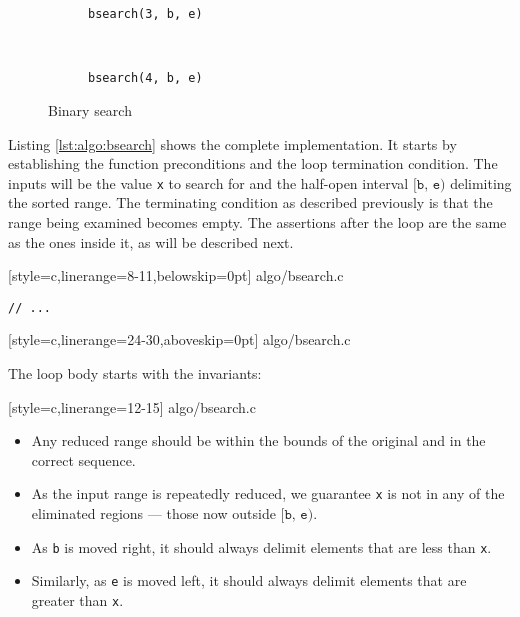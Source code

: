 \begin{figure}[p]
    \centering
    
    \vspace{2\baselineskip}
    \begin{subfigure}[h]{\textwidth}
        \centering
        
        \caption{\texttt{bsearch(3, b, e)}}
        \label{fig:algo:bsearch0}
    \end{subfigure}
    \\[\baselineskip]
    \begin{subfigure}[h]{\textwidth}
        \centering
        
        \caption{\texttt{bsearch(4, b, e)}}
        \label{fig:algo:bsearch1}
    \end{subfigure}
    \caption{Binary search}
\end{figure}

Listing \ref{lst:algo:bsearch} shows the complete implementation.  It starts by
establishing the function preconditions and the loop termination condition.  The
inputs will be the value \texttt{x} to search for and the half-open interval
$\texttt{[b, e)}$ delimiting the sorted range.  The terminating condition as
described previously is that the range being examined becomes empty.  The
assertions after the loop are the same as the ones inside it, as will be
described next.


    [style=c,linerange=8-11,belowskip=0pt]
    {algo/bsearch.c}
\begin{lstlisting}[aboveskip=0pt,belowskip=0pt]
        // ...
\end{lstlisting}

    [style=c,linerange=24-30,aboveskip=0pt]
    {algo/bsearch.c}

The loop body starts with the invariants:


    [style=c,linerange=12-15]
    {algo/bsearch.c}

\vspace{-\baselineskip}
\begin{itemize}
    \item
        Any reduced range should be within the bounds of the original and in the
        correct sequence.
    \item
        As the input range is repeatedly reduced, we guarantee \texttt{x} is not
        in any of the eliminated regions --- those now outside $\texttt{[b, e)}$.
    \item
        As \texttt{b} is moved right, it should always delimit elements that are
        less than \texttt{x}.
    \item
        Similarly, as \texttt{e} is moved left, it should always delimit
        elements that are greater than \texttt{x}.
\end{itemize}

